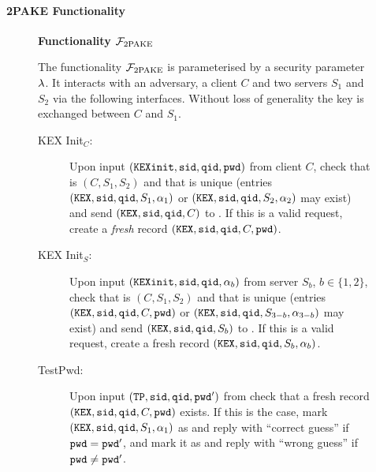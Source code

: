
\paragraph{2PAKE Functionality}


\begin{figure}[tbp]
\begin{mdframed}[innertopmargin=10pt]
\begin{center}
{\bf Functionality $\mathcal{F}_{\mathrm{2PAKE}}$}
\end{center}
The functionality $\mathcal{F}_{\mathrm{2PAKE}}$ is parameterised by a security parameter $\lambda$.
It interacts with an adversary, a client $C$ and two servers $S_1$ and $S_2$ via the following interfaces.
Without loss of generality the key is exchanged between $C$ and $S_1$.

\begin{description}

  \item[KEX Init$_C$:] Upon input $(\mathtt{KEXinit}, \mathtt{sid}, \mathtt{qid}, \mathtt{pwd})$ from client $C$, check that \sid is $(C,S_1, S_2)$ and that \qid is unique (entries $(\mathtt{KEX}, \mathtt{sid}, \mathtt{qid}, S_{1}, \alpha_{1})$ or $(\mathtt{KEX}, \mathtt{sid}, \mathtt{qid}, S_{2}, \alpha_{2})$ may exist) and send $(\mathtt{KEX}, \mathtt{sid}, \mathtt{qid}, C)$ to \SIM.
      If this is a valid request, create a \emph{fresh} record $(\mathtt{KEX}, \mathtt{sid}, \mathtt{qid}, C, \mathtt{pwd})$.
  
  \item[KEX Init$_S$:] Upon input $(\mathtt{KEXinit}, \mathtt{sid}, \mathtt{qid}, \alpha_b)$ from server $S_b$, $b\in\{1,2\}$, check that \sid is $(C,S_1, S_2)$ and that \qid is unique (entries $(\mathtt{KEX}, \mathtt{sid}, \mathtt{qid}, C, \mathtt{pwd})$ or $(\mathtt{KEX}, \mathtt{sid}, \mathtt{qid}, S_{3-b}, \alpha_{3-b})$ may exist) and send $(\mathtt{KEX}, \mathtt{sid}, \mathtt{qid}, S_b)$ to \SIM.
      If this is a valid request, create a fresh record $(\mathtt{KEX}, \mathtt{sid}, \mathtt{qid}, S_b, \alpha_b)$.
    
  \item[TestPwd:] Upon input $(\mathtt{TP}, \mathtt{sid}, \mathtt{qid}, \mathtt{pwd}')$ from \SIM check that a fresh record $(\mathtt{KEX}, \mathtt{sid}, \mathtt{qid}, C, \mathtt{pwd})$ exists. 
      If this is the case, mark $(\mathtt{KEX}, \mathtt{sid}, \mathtt{qid}, S_1, \alpha_1)$ as \compromised and reply with ``correct guess'' if $\mathtt{pwd}=\mathtt{pwd}'$, and mark it as \interrupted and reply with ``wrong guess'' if $\mathtt{pwd}\not=\mathtt{pwd}'$.
    
      

\end{description}
\end{mdframed}
\end{figure}
